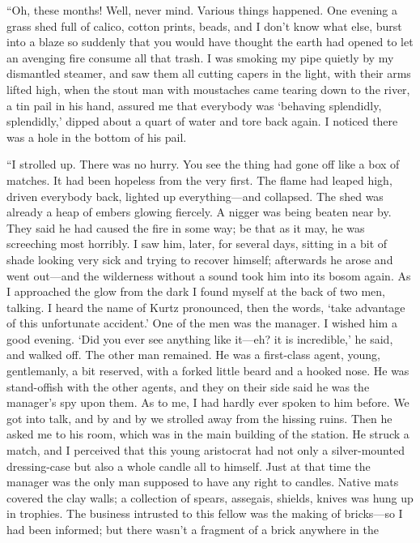 \documentclass[12pt]{report}
\begin{document}
``Oh, these months! Well, never mind. Various things happened. One
evening a grass shed full of calico, cotton prints, beads, and I don't
know what else, burst into a blaze so suddenly that you would have
thought the earth had opened to let an avenging fire consume all that
trash. I was smoking my pipe quietly by my dismantled steamer, and saw
them all cutting capers in the light, with their arms lifted high, when
the stout man with moustaches came tearing down to the river, a tin pail
in his hand, assured me that everybody was `behaving splendidly,
splendidly,' dipped about a quart of water and tore back again. I
noticed there was a hole in the bottom of his pail.

``I strolled up. There was no hurry. You see the thing had gone off like
a box of matches. It had been hopeless from the very first. The flame
had leaped high, driven everybody back, lighted up everything---and
collapsed. The shed was already a heap of embers glowing fiercely. A
nigger was being beaten near by. They said he had caused the fire in
some way; be that as it may, he was screeching most horribly. I saw him,
later, for several days, sitting in a bit of shade looking very sick and
trying to recover himself; afterwards he arose and went out---and the
wilderness without a sound took him into its bosom again. As I
approached the glow from the dark I found myself at the back of two men,
talking. I heard the name of Kurtz pronounced, then the words, `take
advantage of this unfortunate accident.' One of the men was the manager.
I wished him a good evening. `Did you ever see anything like it---eh? it
is incredible,' he said, and walked off. The other man remained. He was
a first-class agent, young, gentlemanly, a bit reserved, with a forked
little beard and a hooked nose. He was stand-offish with the other
agents, and they on their side said he was the manager's spy upon them.
As to me, I had hardly ever spoken to him before. We got into talk, and
by and by we strolled away from the hissing ruins. Then he asked me to
his room, which was in the main building of the station. He struck a
match, and I perceived that this young aristocrat had not only a
silver-mounted dressing-case but also a whole candle all to himself.
Just at that time the manager was the only man supposed to have any
right to candles. Native mats covered the clay walls; a collection of
spears, assegais, shields, knives was hung up in trophies. The business
intrusted to this fellow was the making of bricks---so I had been
informed; but there wasn't a fragment of a brick anywhere in the
\end{document}
